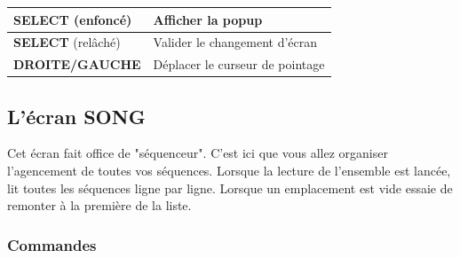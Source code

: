 \documentclass[12pt,a4paper]{article}
\begin{document}
        \tablelasttail{\hline}
        \begin{supertabular}{|l|l|}
        \hline
            {\bf SELECT} (enfoncé) & Afficher la popup \\
            \hline
            {\bf SELECT} (relâché) & Valider le changement d'écran \\
            \hline
            {\bf DROITE/GAUCHE} & Déplacer le curseur de pointage \\
        \hline
        \end{supertabular}
  
    \subsection{L'écran SONG}
    
    Cet écran fait office de "séquenceur". C'est ici que vous allez organiser l'agencement de toutes vos séquences. Lorsque la lecture de l'ensemble est lancée, \FAT lit toutes les séquences ligne par ligne. Lorsque un emplacement est vide \FAT essaie de remonter à la première de la liste.
    
    
        \subsubsection{Commandes}
        
\end{document}
